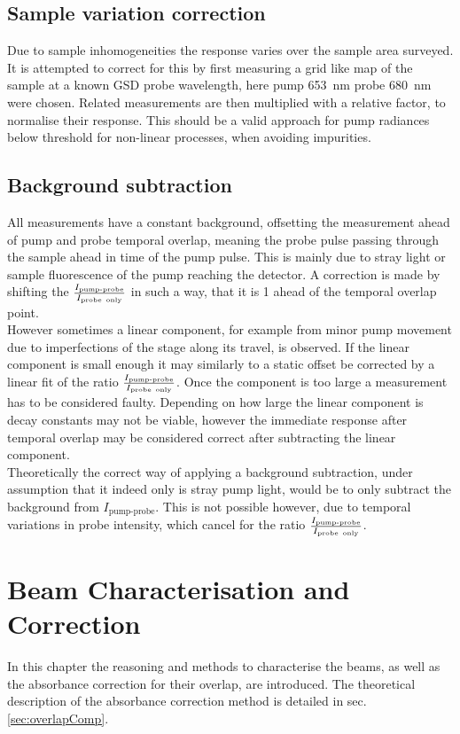 \documentclass[twoside,openright,listof=numbered]{scrreprt}
\begin{document}
\section{Sample variation correction}
Due to sample inhomogeneities  the response varies over the sample area surveyed. It is attempted to correct for this by first measuring a grid like map of the sample at a known GSD probe wavelength, here pump \qty{653}{\nano\meter} probe \qty{680}{\nano\meter} were chosen. Related measurements are then multiplied with a relative factor, to normalise their response. This should be a valid approach for pump radiances below threshold for non-linear processes, when avoiding impurities.

\section{Background subtraction}
All measurements have a constant background, offsetting the measurement ahead of pump and probe temporal overlap, meaning the probe pulse passing through the sample ahead in time of the pump pulse. This is mainly due to stray light or sample fluorescence of the pump reaching the detector.  A correction is made by shifting the ${\frac{I_\text{pump-probe}}{I_\text{probe\, only}}}$ in such a way, that it is 1 ahead of the temporal overlap point. \\
However sometimes a linear component, for example from minor pump movement due to imperfections of the stage along its travel, is observed. If the linear component is small enough it may similarly to a static offset be corrected by a linear fit of the ratio ${\frac{I_\text{pump-probe}}{I_\text{probe\, only}}}$. Once the component is too large a measurement has to be considered faulty. Depending on how large the linear component is decay constants may not be viable, however the immediate response after temporal overlap may be considered correct after subtracting the linear component.\\

Theoretically the correct way of applying a background subtraction, under assumption that it indeed only is stray pump light, would be to only subtract the background from ${I_\text{pump-probe}}$. This is not possible however, due to temporal variations in probe intensity, which cancel for the ratio ${\frac{I_\text{pump-probe}}{I_\text{probe\, only}}}$.



\chapter{Beam Characterisation and Correction}\label{chp:OverlapCorrection}
In this chapter the reasoning and methods to characterise the beams, as well as the absorbance correction for their overlap, are introduced. The theoretical description of the absorbance correction method is detailed in sec. \ref{sec:overlapComp}.
\end{document}
